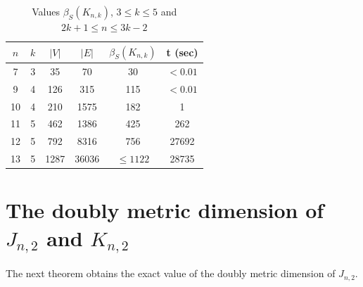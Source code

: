 \documentclass[preprint,12pt]{elsarticle}
\begin{document}
\begin{table}
\caption{Values $\beta_S(K_{n,k})$, $3 \le k \le 5$ and $2k+1 \le n \le 3k-2$} \label{gurk}
 \small
\begin{center} 
\begin{tabular}{|c|c|c|c|c|c|}
\hline
$n$ & $k$ & $|V|$ & $|E|$ & $\beta_S(K_{n,k})$ & t (sec)\\
 \hline
7  & 3  & 35  & 70   & 30 & $ < 0.01$  \\
 \hline                                                  
9  & 4  & 126  & 315  & 115 & $ < 0.01$  \\
10 & 4  & 210  & 1575 & 182 & 1  \\
 \hline
11  & 5  & 462  & 1386  & 425 & 262  \\
12  & 5  & 792  & 8316  & 756 & 27692  \\
13  & 5  & 1287 & 36036 & $\le 1122$ & 28735  \\
 \hline
\end{tabular}
\end{center}
\end{table}  
 


\section{The doubly metric dimension of $J_{n,2}$ and $K_{n,2}$}

The next theorem obtains the exact value of the doubly metric dimension of $J_{n,2}$.
\end{document}
